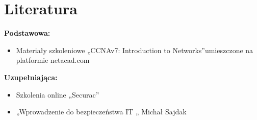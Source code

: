\documentclass[12pt, a4paper]{article}
\begin{document}
\section{Literatura}

\textbf{Podstawowa:}
\begin{itemize}
  \item Materiały szkoleniowe „CCNAv7: Introduction to Networks”umieszczone na platformie netacad.com
\end{itemize}

\textbf{Uzupełniająca:}
\begin{itemize}
  \item Szkolenia  online „Securac''
  \item „Wprowadzenie do bezpieczeństwa IT „ Michał Sajdak
\end{itemize}
\end{document}
